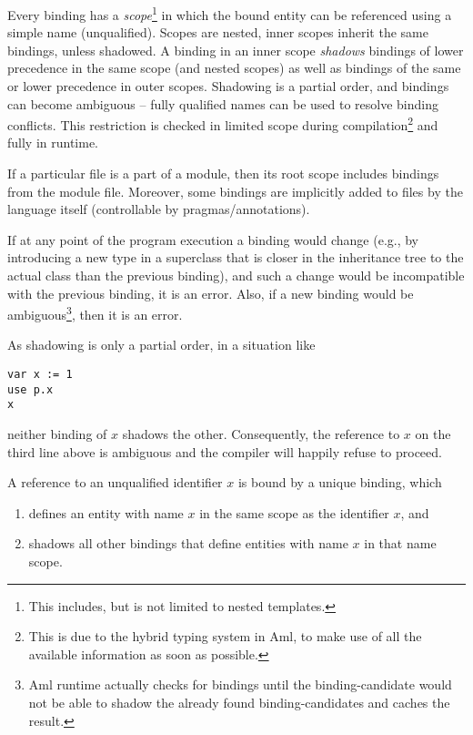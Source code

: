 Every binding has a \emph{scope}\footnote{This includes, but is not limited to nested templates.} in which the bound entity can be referenced using a simple name (unqualified). Scopes are nested, inner scopes inherit the same bindings, unless shadowed. A binding in an inner scope \emph{shadows} bindings of lower precedence in the same scope (and nested scopes) as well as bindings of the same or lower precedence in outer scopes. Shadowing is a partial order, and bindings can become ambiguous -- fully qualified names can be used to resolve binding conflicts. This restriction is checked in limited scope during compilation\footnote{This is due to the hybrid typing system in Aml, to make use of all the available information as soon as possible.} and fully in runtime. 

If a particular file is a part of a module, then its root scope includes bindings from the module file. Moreover, some bindings are implicitly added to files by the language itself (controllable by pragmas/annotations). 

If at any point of the program execution a binding would change (e.g., by introducing a new type in a superclass that is closer in the inheritance tree to the actual class than the previous binding), and such a change would be incompatible with the previous binding, it is an error. Also, if a new binding would be ambiguous\footnote{Aml runtime actually checks for bindings until the binding-candidate would not be able to shadow the already found binding-candidates and caches the result.}, then it is an error. 

As shadowing is only a partial order, in a situation like

\begin{lstlisting}
var x := 1
use p.x
x
\end{lstlisting}

neither binding of $x$ shadows the other. Consequently, the reference to $x$ on the third line above is ambiguous and the compiler will happily refuse to proceed. 

A reference to an unqualified identifier $x$ is bound by a unique binding, which

\begin{enumerate}
\item defines an entity with name $x$ in the same scope as the identifier $x$, and
\item shadows all other bindings that define entities with name $x$ in that name scope.
\end{enumerate}

